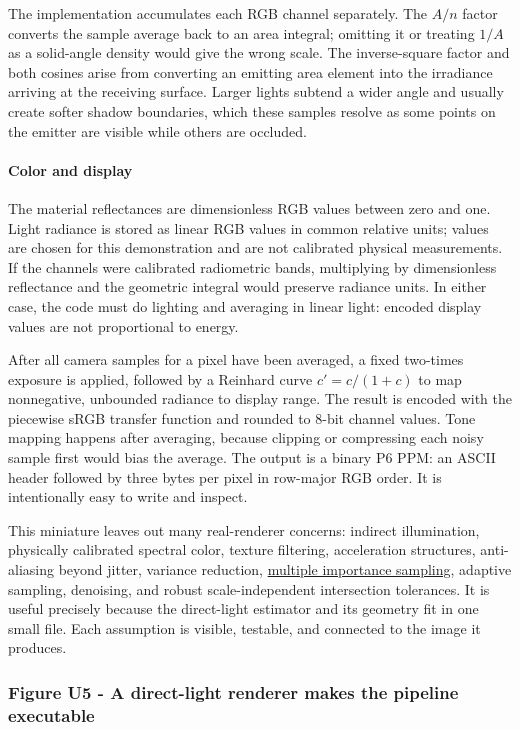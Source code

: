 The implementation accumulates each RGB channel separately. The \(A/n\) factor converts the sample average back to an area integral; omitting it or treating \(1/A\) as a solid-angle density would give the wrong scale. The inverse-square factor and both cosines arise from converting an emitting area element into the irradiance arriving at the receiving surface. Larger lights subtend a wider angle and usually create softer shadow boundaries, which these samples resolve as some points on the emitter are visible while others are occluded.

\paragraph{Color and display}\label{color-and-display}

The material reflectances are dimensionless RGB values between zero and one. Light radiance is stored as linear RGB values in common relative units; values are chosen for this demonstration and are not calibrated physical measurements. If the channels were calibrated radiometric bands, multiplying by dimensionless reflectance and the geometric integral would preserve radiance units. In either case, the code must do lighting and averaging in linear light: encoded display values are not proportional to energy.

After all camera samples for a pixel have been averaged, a fixed two-times exposure is applied, followed by a Reinhard curve \(c'=c/(1+c)\) to map nonnegative, unbounded radiance to display range. The result is encoded with the piecewise sRGB transfer function and rounded to 8-bit channel values. Tone mapping happens after averaging, because clipping or compressing each noisy sample first would bias the average. The output is a binary P6 PPM: an ASCII header followed by three bytes per pixel in row-major RGB order. It is intentionally easy to write and inspect.

This miniature leaves out many real-renderer concerns: indirect illumination, physically calibrated spectral color, texture filtering, acceleration structures, anti-aliasing beyond jitter, variance reduction, \hyperref[appendix-031e02bf28af]{multiple importance sampling}, adaptive sampling, denoising, and robust scale-independent intersection tolerances. It is useful precisely because the direct-light estimator and its geometry fit in one small file. Each assumption is visible, testable, and connected to the image it produces.

\subsubsection{Figure U5 - A direct-light renderer makes the pipeline executable}\label{figure-u5---a-direct-light-renderer-makes-the-pipeline-executable}

